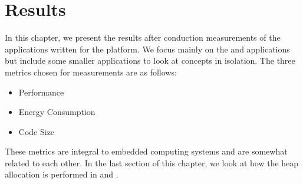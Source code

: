 
\chapter{Results}
\label{chap:results}

In this chapter, we present the results after conduction measurements of the applications written for the {\rg} platform.
We focus mainly on the {\tracker} and {\cg} applications but include some smaller applications to look at concepts in isolation.
The three metrics chosen for measurements are as follows:
\begin{itemize}
  \item Performance
  \item Energy Consumption
  \item Code Size
\end{itemize}
These metrics are integral to embedded computing systems and are somewhat related to each other.
In the last section of this chapter, we look at how the heap allocation is performed in {\rust} and {\C}.





